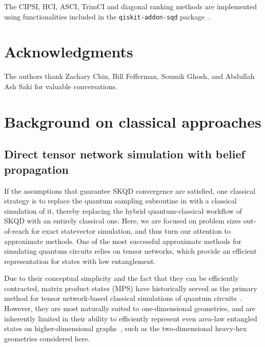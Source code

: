 \documentclass[
  reprint,            %
  amsmath,amssymb,
  aps,
  superscriptaddress, %
  longbibliography
]{revtex4-2}
\theoremstyle{definition}
\begin{document}
The CIPSI, HCI, ASCI, TrimCI and diagonal ranking methods are implemented using functionalities included in the \texttt{qiskit-addon-sqd} package~\cite{qiskit-addon-sqd}. 

\section*{Acknowledgments}

The authors thank Zachary Chin, Bill Fefferman, Soumik Ghosh, and Abdullah Ash Saki for valuable conversations.


\pagebreak




\appendix


\section{Background on classical approaches}
\label{app:classical_approaches}

\subsection{Direct tensor network simulation with belief propagation} \label{sapp:tensornetwork}

If the assumptions that guarantee SKQD convergence are satisfied, one classical strategy is to replace the quantum sampling subroutine in  with a classical simulation of it, thereby replacing the hybrid quantum-classical workflow of SKQD with an entirely classical one. Here, we are focused on problem sizes out-of-reach for exact statevector simulation, and thus turn our attention to approximate methods. One of the most successful approximate methods for simulating quantum circuits relies on tensor networks, which provide an efficient representation for states with low entanglement. 

Due to their conceptual simplicity and the fact that they can be efficiently contracted, matrix product states (MPS) have historically served as the primary method for tensor network-based classical simulations of quantum circuits~\cite{Banuls_SimulationManyqubit_2006, Cirac_MatrixProduct_2021, Zhou_WhatLimits_2020, Napp_EfficientClassical_2022}. However, they are most naturally suited to one-dimensional geometries, and are inherently limited in their ability to efficiently represent even area-law entangled states on higher-dimensional graphs~\cite{Stoudenmire_StudyingTwoDimensional_2012, kim2023evidence, King_BeyondclassicalComputation_2025}, such as the two-dimensional heavy-hex geometries considered here.
\end{document}
